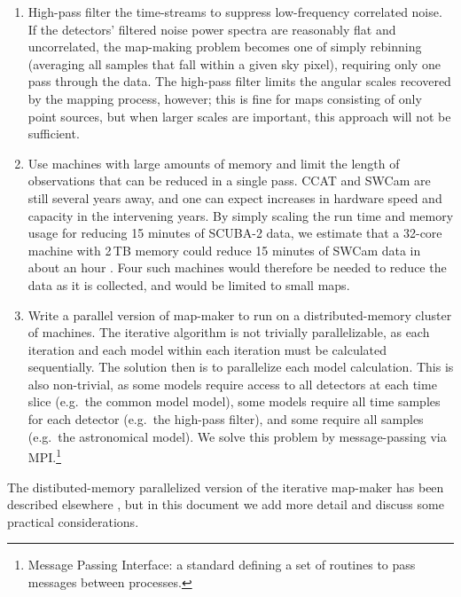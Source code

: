 \documentclass[oneside,11pt]{starlink}
\begin{document}
\begin{enumerate}

\item High-pass filter the time-streams to suppress low-frequency
  correlated noise. If the detectors' filtered noise power spectra are
  reasonably flat and uncorrelated, the map-making problem becomes one
  of simply rebinning (averaging all samples that fall within a given
  sky pixel), requiring only one pass through the data. The high-pass
  filter limits the angular scales recovered by the mapping process,
  however; this is fine for maps consisting of only point sources, but
  when larger scales are important, this approach will not be
  sufficient.

\item Use machines with large amounts of memory and limit the length
  of observations that can be reduced in a single pass. CCAT and SWCam
  are still several years away, and one can expect increases in
  hardware speed and capacity in the intervening years. By simply
  scaling the run time and memory usage for reducing 15 minutes of
  SCUBA-2 data, we estimate that a 32-core machine with 2\,TB memory
  could reduce 15 minutes of SWCam data in about an hour
  \cite{marsden2014a}. Four such machines would therefore be needed to
  reduce the data as it is collected, and would be limited to small
  maps.

\item Write a parallel version of map-maker to run on a
  distributed-memory cluster of machines. The iterative algorithm is
  not trivially parallelizable, as each iteration and each model
  within each iteration must be calculated sequentially. The solution
  then is to parallelize each model calculation. This is also
  non-trivial, as some models require access to all detectors at each
  time slice (e.g.\ the common model model), some models require all
  time samples for each detector (e.g.\ the high-pass filter), and
  some require all samples (e.g.\ the astronomical model). We solve
  this problem by message-passing via MPI.\footnote{Message Passing
    Interface: a standard defining a set of routines to pass messages
    between processes.}

\end{enumerate}

The distibuted-memory parallelized version of the iterative map-maker
has been described elsewhere \cite{marsden2014b}, but in this document
we add more detail and discuss some practical considerations.
\end{document}
